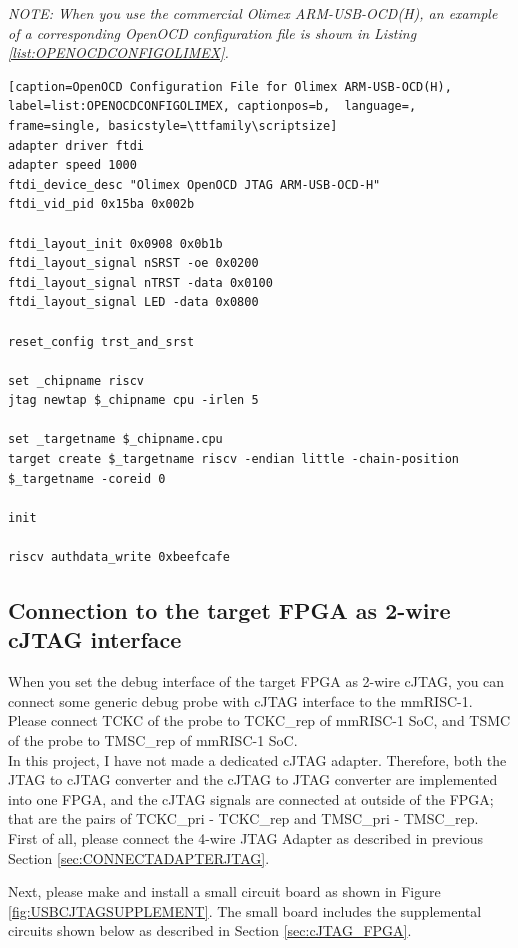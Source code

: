 \textit{NOTE: When you use the commercial Olimex ARM-USB-OCD(H), an example of a corresponding OpenOCD configuration file is shown in Listing \ref{list:OPENOCDCONFIGOLIMEX}.}

\begin{lstlisting}[caption=OpenOCD Configuration File for Olimex ARM-USB-OCD(H), label=list:OPENOCDCONFIGOLIMEX, captionpos=b,  language=, frame=single, basicstyle=\ttfamily\scriptsize]
adapter driver ftdi
adapter speed 1000
ftdi_device_desc "Olimex OpenOCD JTAG ARM-USB-OCD-H"
ftdi_vid_pid 0x15ba 0x002b

ftdi_layout_init 0x0908 0x0b1b
ftdi_layout_signal nSRST -oe 0x0200
ftdi_layout_signal nTRST -data 0x0100
ftdi_layout_signal LED -data 0x0800

reset_config trst_and_srst

set _chipname riscv
jtag newtap $_chipname cpu -irlen 5

set _targetname $_chipname.cpu
target create $_targetname riscv -endian little -chain-position $_targetname -coreid 0

init

riscv authdata_write 0xbeefcafe
\end{lstlisting}


\subsection{Connection to the target FPGA as 2-wire cJTAG interface}

When you set the debug interface of the target FPGA as 2-wire cJTAG, you can connect some generic debug probe with cJTAG interface to the mmRISC-1. Please connect TCKC of the probe to TCKC\_rep of mmRISC-1 SoC, and TSMC of the probe to TMSC\_rep of mmRISC-1 SoC.\\

In this project, I have not made a dedicated cJTAG adapter. Therefore, both the JTAG to cJTAG converter and the cJTAG to JTAG converter are implemented into one FPGA, and the cJTAG signals are connected at outside of the FPGA; that are the pairs of TCKC\_pri - TCKC\_rep and TMSC\_pri - TMSC\_rep.\\

First of all, please connect the 4-wire JTAG Adapter as described in previous Section \ref{sec:CONNECTADAPTERJTAG}. 

Next, please make and install a small circuit board as shown in Figure \ref{fig:USBCJTAGSUPPLEMENT}. The small board includes the supplemental circuits shown below as described in Section \ref{sec:cJTAG_FPGA}.

